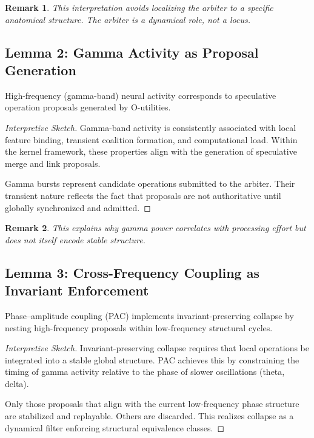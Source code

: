 \documentclass[11pt]{article}
\newtheorem{remark}{Remark}
\begin{document}
\begin{remark}
This interpretation avoids localizing the arbiter to a specific anatomical structure. The arbiter is a \emph{dynamical role}, not a locus.
\end{remark}

\subsection{Lemma 2: Gamma Activity as Proposal Generation}

\begin{lemma}
\label{lem:gamma_proposal}
High-frequency (gamma-band) neural activity corresponds to speculative operation proposals generated by O-utilities.
\end{lemma}

\begin{proof}[Interpretive Sketch]
Gamma-band activity is consistently associated with local feature binding, transient coalition formation, and computational load. Within the kernel framework, these properties align with the generation of speculative merge and link proposals.

Gamma bursts represent candidate operations submitted to the arbiter. Their transient nature reflects the fact that proposals are not authoritative until globally synchronized and admitted.
\end{proof}

\begin{remark}
This explains why gamma power correlates with processing effort but does not itself encode stable structure.
\end{remark}

\subsection{Lemma 3: Cross-Frequency Coupling as Invariant Enforcement}

\begin{lemma}
\label{lem:pac_collapse}
Phase–amplitude coupling (PAC) implements invariant-preserving collapse by nesting high-frequency proposals within low-frequency structural cycles.
\end{lemma}

\begin{proof}[Interpretive Sketch]
Invariant-preserving collapse requires that local operations be integrated into a stable global structure. PAC achieves this by constraining the timing of gamma activity relative to the phase of slower oscillations (theta, delta).

Only those proposals that align with the current low-frequency phase structure are stabilized and replayable. Others are discarded. This realizes collapse as a dynamical filter enforcing structural equivalence classes.
\end{proof}
\end{document}
